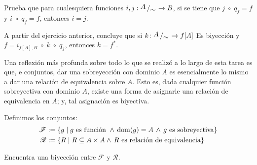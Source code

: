 \documentclass[letterpaper,DIV=14,headsepline,12pt]{scrartcl}
\newcommand{\pts}{}
\newenvironment{ejercicio}[1]{\ifthenelse{\equal{#1}{1} \OR
\equal{#1}{+1}}{\renewcommand{\pts}{\textbf{(#1
pt)}}}{\renewcommand{\pts}{\textbf{(#1 pts)}}}\begin{ejj}\upshape
\pts}{\end{ejj}}
\newcommand{\quot}[2]{{\raisebox{.2em}{$#1$}\left/\raisebox{-.2em}{$#2$}\right.}}
\begin{document}
    \begin{ejercicio}{+1}
        Prueba que para cualesquiera funciones $i,j:\quot{A}{\sim}\to B$, si se tiene que 
        $ j \; \circ \; q_f = f$ y $ i  \; \circ \; q_f = f$, entonces $i=j$.
    \end{ejercicio}
    
    \begin{ejercicio}{+1}
        A partir del ejercicio anterior, concluye que si $k\colon \quot{A}{\sim} \to f[A]$ Es
        biyección y $f = i_{f[A],B} \; \circ \; k \; \circ \; q_f$, entonces $k=f^*$.
    \end{ejercicio}

    Una reflexión más profunda sobre todo lo que se realizó a lo largo de esta tarea es que, 
    e conjuntos, dar una sobreyección con dominio $A$ es esencialmente lo mismo a dar una
    relación de equivalencia sobre $A$. Esto es, dada cualquier función sobreyectiva con dominio 
    $A$, existe una forma de asignarle una relación de equivalencia
    en $A$; y, tal asignación es biyectiva.
    
    \begin{ejercicio}{+2}
        Definimos los conjuntos:
        \begin{align*}
            \mathscr{F} & :=\{ g \mid g \text{ es función } \land \, \operatorname{dom}(g)=A \, \land \, g \text{ es sobreyectiva} \} \\
            \mathscr{R} & :=\{ R \mid R \subseteq A \times A \land \, R \text{ es relación de equivalencia} \}
        \end{align*}

        Encuentra una biyección entre $\mathscr{F}$ y $\mathscr{R}$.
    \end{ejercicio}
\end{document}
